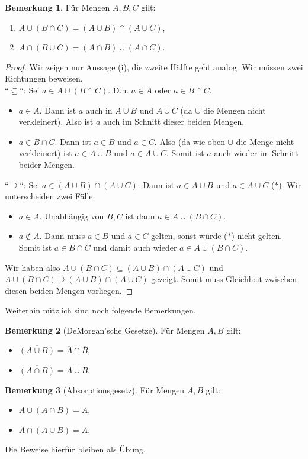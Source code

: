 \documentclass[11pt, a4paper]{article}
\theoremstyle{definition}
\newtheorem*{remark*}{Bemerkung}
\theoremstyle{plain}
\numberwithin{equation}{section}
\newcommand{\comp}[1]{\overline{#1}}
\begin{document}
\begin{remark*}
	Für Mengen \( A, B, C \) gilt:
	\begin{enumerate}
		\item \( A \cup (B \cap C) = (A \cup B) \cap (A \cup C) \),
		\item \( A \cap (B \cup C) = (A \cap B) \cup (A \cap C) \).
	\end{enumerate}
	\begin{proof}
		Wir zeigen nur Aussage (i), die zweite Hälfte geht analog. Wir müssen zwei Richtungen beweisen.\\
		``\( \subseteq \)``: Sei \( a \in A \cup (B \cap C) \). D.h. \( a \in A \) oder \( a \in B \cap C \).
		\begin{itemize}
			\item \( a \in A \). Dann ist \( a \) auch in \( A \cup B \) und \( A \cup C \) (da \( \cup \) die Mengen nicht verkleinert). Also ist \( a \) auch im Schnitt dieser beiden Mengen.
			\item \( a \in B \cap C \). Dann ist \( a \in B \) und \( a \in C \). Also (da wie oben \( \cup \) die Menge nicht verkleinert) ist \( a \in A \cup B \) und \( a \in A \cup C \). Somit ist \( a \) auch wieder im Schnitt beider Mengen.
		\end{itemize}
		``\( \supseteq \)``: Sei \( a \in (A \cup B) \cap (A \cup C) \). Dann ist \( a \in A \cup B \) und \( a \in A \cup C \) (\( \ast \)). Wir unterscheiden zwei Fälle:
		\begin{itemize}
			\item \( a \in A \). Unabhängig von \( B, C \) ist dann \( a \in A \cup (B \cap C) \).
			\item \( a \notin A \). Dann muss \( a \in B \) und \( a \in C \) gelten, sonst würde (\( \ast \)) nicht gelten. Somit ist \( a \in B \cap C \) und damit auch wieder \( a \in A \cup (B \cap C) \). 
		\end{itemize}
		Wir haben also \( A \cup (B \cap C) \subseteq (A \cup B) \cap (A \cup C) \) und \( A \cup (B \cap C) \supseteq (A \cup B) \cap (A \cup C) \) gezeigt. Somit muss Gleichheit zwischen diesen beiden Mengen vorliegen.
	\end{proof}
\end{remark*}
Weiterhin nützlich sind noch folgende Bemerkungen.
\begin{remark*}[DeMorgan'sche Gesetze]
	Für Mengen \( A, B \) gilt:
	\begin{itemize}
		\item \( \comp{(A \cup B)} = \comp{A} \cap \comp{B} \),
		\item \( \comp{(A \cap B)} = \comp{A} \cup \comp{B} \).
	\end{itemize}
\end{remark*}
\begin{remark*}[Absorptionsgesetz]
	Für Mengen \( A, B \) gilt:
	\begin{itemize}
		\item \( A \cup (A \cap B) = A \),
		\item \( A \cap (A \cup B) = A \).
	\end{itemize}
\end{remark*}
Die Beweise hierfür bleiben als Übung.
\end{document}

